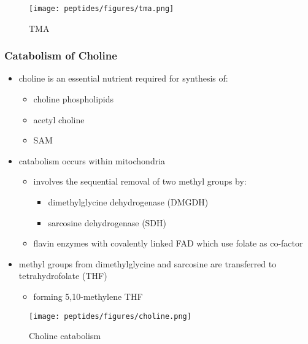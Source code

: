 \documentclass[12pt]{scrartcl}
\begin{document}
\begin{figure}[htbp]
\centering
\texttt{[image: peptides/figures/tma.png]}
\caption{\label{fig:org1e9ee34}TMA}
\end{figure}

\subsubsection{Catabolism of Choline}
\label{sec:orge3fd50a}
\begin{itemize}
\item choline is an essential nutrient required for synthesis of:
\begin{itemize}
\item choline phospholipids
\item acetyl choline
\item SAM
\end{itemize}
\item catabolism occurs within mitochondria
\begin{itemize}
\item involves the sequential removal of two methyl groups by:
\begin{itemize}
\item dimethylglycine dehydrogenase (DMGDH)
\item sarcosine dehydrogenase (SDH)
\end{itemize}
\item flavin enzymes with covalently linked FAD which use folate as co-factor
\end{itemize}
\item methyl groups from dimethylglycine and sarcosine are transferred to
tetrahydrofolate (THF)
\begin{itemize}
\item forming 5,10-methylene THF
\end{itemize}
\end{itemize}

\begin{figure}[htbp]
\centering
\texttt{[image: peptides/figures/choline.png]}
\caption{\label{fig:org50fee16}Choline catabolism}
\end{figure}
\end{document}
